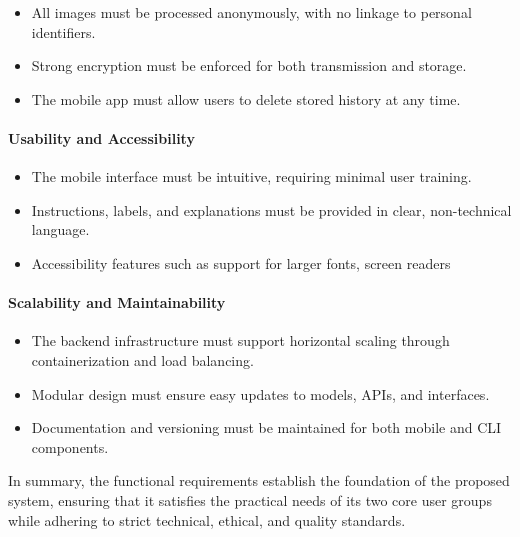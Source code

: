 \documentclass[
  12pt,
  oneside]{article}
\providecommand{\tightlist}{%
  \setlength{\itemsep}{0pt}\setlength{\parskip}{0pt}}
\begin{document}
\begin{itemize}
\tightlist
\item
  All images must be processed anonymously, with no linkage to personal
  identifiers.\\
\item
  Strong encryption must be enforced for both transmission and
  storage.\\
\item
  The mobile app must allow users to delete stored history at any time.
\end{itemize}

\paragraph{Usability and
Accessibility}\label{usability-and-accessibility}

\begin{itemize}
\tightlist
\item
  The mobile interface must be intuitive, requiring minimal user
  training.\\
\item
  Instructions, labels, and explanations must be provided in clear,
  non-technical language.\\
\item
  Accessibility features such as support for larger fonts, screen
  readers
\end{itemize}

\paragraph{Scalability and
Maintainability}\label{scalability-and-maintainability}

\begin{itemize}
\tightlist
\item
  The backend infrastructure must support horizontal scaling through
  containerization and load balancing.\\
\item
  Modular design must ensure easy updates to models, APIs, and
  interfaces.\\
\item
  Documentation and versioning must be maintained for both mobile and
  CLI components.
\end{itemize}

In summary, the functional requirements establish the foundation of the
proposed system, ensuring that it satisfies the practical needs of its
two core user groups while adhering to strict technical, ethical, and
quality standards.
\end{document}
